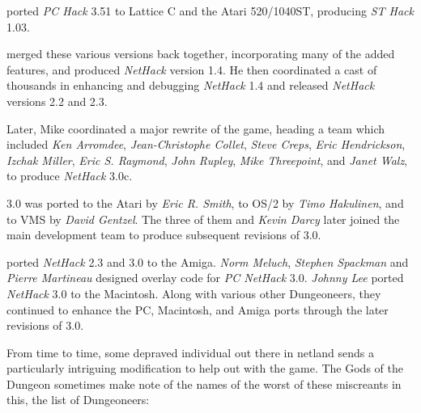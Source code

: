 \medskip
{} ported {\it PC Hack\/} 3.51 to Lattice C and the Atari
520/1040ST, producing {\it ST Hack\/} 1.03.

\medskip
{} merged these various versions back together,
incorporating many of the added features, and produced {\it NetHack\/} version
1.4.  He then coordinated a cast of thousands in enhancing and debugging
{\it NetHack\/} 1.4 and released {\it NetHack\/} versions 2.2 and 2.3.

\medskip
\nd Later, Mike coordinated a major rewrite of the game, heading a team which
included {\it Ken Arromdee}, {\it Jean-Christophe Collet}, {\it Steve Creps},
{\it Eric Hendrickson}, {\it Izchak Miller}, {\it Eric S. Raymond}, {\it John
Rupley}, {\it Mike Threepoint}, and {\it Janet Walz}, to produce {\it
NetHack\/} 3.0c.

\medskip
{} 3.0 was ported to the Atari by {\it Eric R. Smith}, to OS/2 by
{\it Timo Hakulinen}, and to VMS by {\it David Gentzel}.  The three of them
and {\it Kevin Darcy\/} later joined the main development team to produce
subsequent revisions of 3.0.

\medskip
{} ported {\it NetHack\/} 2.3 and 3.0 to the Amiga.  {\it
Norm Meluch}, {\it Stephen Spackman\/} and {\it Pierre Martineau\/} designed
overlay code for {\it PC NetHack\/} 3.0.  {\it Johnny Lee\/} ported {\it
NetHack\/} 3.0 to the Macintosh.  Along with various other Dungeoneers, they
continued to enhance the PC, Macintosh, and Amiga ports through the later
revisions of 3.0.

\bigskip
\nd From time to time, some depraved individual out there in netland sends a
particularly intriguing modification to help out with the game.  The Gods of
the Dungeon sometimes make note of the names of the worst of these miscreants
in this, the list of Dungeoneers:

